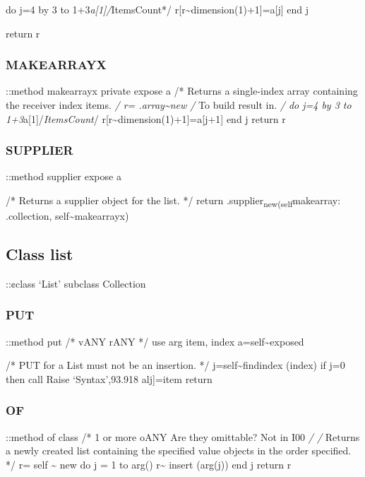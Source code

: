 do j=4 by 3 to 1+3\emph{a{[}1{]}/}ItemsCount*/
r{[}r\textasciitilde dimension(1)+1{]}=a{[}j{]} end j

return r

\hypertarget{makearrayx}{%
\subsubsection{MAKEARRAYX}\label{makearrayx}}

::method makearrayx private expose a /* Returns a single-index array
containing the receiver index items. \emph{/ r=
.array\textasciitilde new /} To build result in. \emph{/ do j=4 by 3 to
1+3}a{[}1{]}/\emph{ItemsCount}/
r{[}r\textasciitilde dimension(1)+1{]}=a{[}j+1{]} end j return r

\hypertarget{supplier}{%
\subsubsection{SUPPLIER}\label{supplier}}

::method supplier expose a

/* Returns a supplier object for the list. */ return
.supplier\textsubscript{new(self}makearray: .collection,
self\textasciitilde makearrayx)

\hypertarget{class-list}{%
\subsection{Class list}\label{class-list}}

::¢class `List' subclass Collection

\hypertarget{put-1}{%
\subsubsection{PUT}\label{put-1}}

::method put /* vANY rANY */ use arg item, index
a=self\textasciitilde exposed

/* PUT for a List must not be an insertion. */
j=self\textasciitilde findindex (index) if j=0 then call Raise
`Syntax',93.918 alj{]}=item return

\hypertarget{of}{%
\subsubsection{OF}\label{of}}

::method of class /* 1 or more oANY Are they omittable? Not in I00
\emph{/ /} Returns a newly created list containing the specified value
objects in the order specified. */ r= self \textasciitilde{} new do j =
1 to arg() r\textasciitilde{} insert (arg(j)) end j return r


